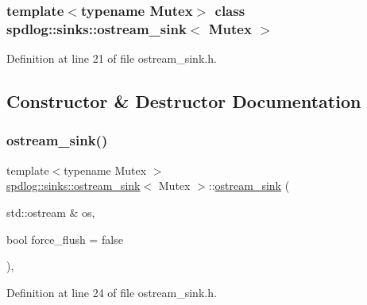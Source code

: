 \subsubsection*{template$<$typename Mutex$>$\newline
class spdlog\+::sinks\+::ostream\+\_\+sink$<$ Mutex $>$}



Definition at line 21 of file ostream\+\_\+sink.\+h.



\subsection{Constructor \& Destructor Documentation}
\mbox{\label{classspdlog_1_1sinks_1_1ostream__sink_aa038c6518dc69c08a1251e7469bc4fd8}} 
\subsubsection{\texorpdfstring{ostream\+\_\+sink()}{ostream\_sink()}\hspace{0.1cm}{\footnotesize\ttfamily [1/2]}}
{\footnotesize\ttfamily template$<$typename Mutex $>$ \\
\hyperlink{classspdlog_1_1sinks_1_1ostream__sink}{spdlog\+::sinks\+::ostream\+\_\+sink}$<$ Mutex $>$\+::\hyperlink{classspdlog_1_1sinks_1_1ostream__sink}{ostream\+\_\+sink} (\begin{DoxyParamCaption}\item[{std\+::ostream \&}]{os,  }\item[{bool}]{force\+\_\+flush = {\ttfamily false} }\end{DoxyParamCaption})\hspace{0.3cm}{\ttfamily [inline]}, {\ttfamily [explicit]}}



Definition at line 24 of file ostream\+\_\+sink.\+h.

